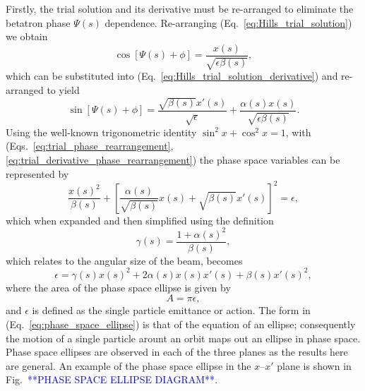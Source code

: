 \documentclass[../main.tex]{subfiles}
\begin{document}
Firstly, the trial solution and its derivative must be re-arranged to eliminate the betatron phase $\Psi\left(s\right)$ dependence. Re-arranging (Eq.~\ref{eq:Hills_trial_solution}) we obtain
\begin{equation}
\cos\left[\Psi\left(s\right)+\phi\right] = \frac{x\left(s\right)}{\sqrt{\epsilon\beta\left(s\right)}},
\label{eq:trial_phase_rearrangement}    
\end{equation}
which can be substituted into (Eq.~\ref{eq:Hills_trial_solution_derivative}) and re-arranged to yield
\begin{equation}
\sin\left[\Psi\left(s\right)+\phi\right] = \frac{\sqrt{\beta\left(s\right)}x'\left(s\right)}{\sqrt{\epsilon}} + \frac{\alpha\left(s\right)x\left(s\right)}{\sqrt{\epsilon\beta\left(s\right)}}.
\label{eq:trial_derivative_phase_rearrangement}    
\end{equation}
Using the well-known trigonometric identity $\sin^{2}x+\cos^{2}x=1$, with (Eqs.~\ref{eq:trial_phase_rearrangement}, \ref{eq:trial_derivative_phase_rearrangement}) the phase space variables can be represented by
\begin{equation}
\frac{x\left(s\right)^{2}}{\beta\left(s\right)}+\left[\frac{\alpha\left(s\right)}{\sqrt{\beta\left(s\right)}}x\left(s\right)+\sqrt{\beta\left(s\right)}x'\left(s\right)\right]^{2} = \epsilon,    
\label{eq:phase_space_trigonometry}
\end{equation}
which when expanded and then simplified using the definition
\begin{equation}
\gamma\left(s\right) = \frac{1+\alpha\left(s\right)^{2}}{\beta\left(s\right)},
\label{eq:gamma_twiss}    
\end{equation}
which relates to the angular size of the beam, becomes
\begin{equation}
\epsilon = \gamma\left(s\right)x\left(s\right)^{2}+2\alpha\left(s\right)x\left(s\right)x'\left(s\right)+\beta\left(s\right)x'\left(s\right)^{2},
\label{eq:phase_space_ellipse}    
\end{equation}
where the area of the phase space ellipse is given by
\begin{equation}
A=\pi\epsilon,
\label{eq:phase_space_area}    
\end{equation} 
and $\epsilon$ is defined as the single particle emittance or action. The form in (Eq.~\ref{eq:phase_space_ellipse}) is that of the equation of an ellipse; consequently the motion of a single particle arount an orbit maps out an ellipse in phase space. Phase space ellipses are observed in each of the three planes as the results here are general. An example of the phase space ellipse in the $x$--$x'$ plane is shown in Fig.~\textcolor{blue}{**PHASE SPACE ELLIPSE DIAGRAM**}.
\end{document}
